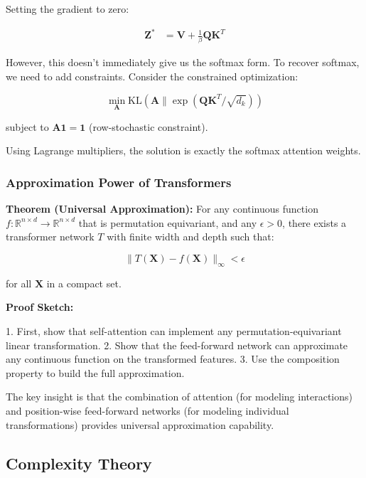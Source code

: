Setting the gradient to zero:

\begin{align}
\mathbf{Z}^* &= \mathbf{V} + \frac{1}{\beta} \mathbf{Q} \mathbf{K}^T
\end{align}

However, this doesn't immediately give us the softmax form. To recover softmax, we need to add constraints. Consider the constrained optimization:

\begin{equation}
\min_{\mathbf{A}} \text{KL}(\mathbf{A} \| \exp(\mathbf{Q}\mathbf{K}^T / \sqrt{d_k}))
\end{equation}

subject to $\mathbf{A} \mathbf{1} = \mathbf{1}$ (row-stochastic constraint).

Using Lagrange multipliers, the solution is exactly the softmax attention weights.

\subsubsection{Approximation Power of Transformers}

\textbf{Theorem (Universal Approximation):} For any continuous function $f: \mathbb{R}^{n \times d} \rightarrow \mathbb{R}^{n \times d}$ that is permutation equivariant, and any $\epsilon > 0$, there exists a transformer network $T$ with finite width and depth such that:

\begin{equation}
\|T(\mathbf{X}) - f(\mathbf{X})\|_{\infty} < \epsilon
\end{equation}

for all $\mathbf{X}$ in a compact set.

\textbf{Proof Sketch:}

1. First, show that self-attention can implement any permutation-equivariant linear transformation.
2. Show that the feed-forward network can approximate any continuous function on the transformed features.
3. Use the composition property to build the full approximation.

The key insight is that the combination of attention (for modeling interactions) and position-wise feed-forward networks (for modeling individual transformations) provides universal approximation capability.

\subsection{Complexity Theory}


